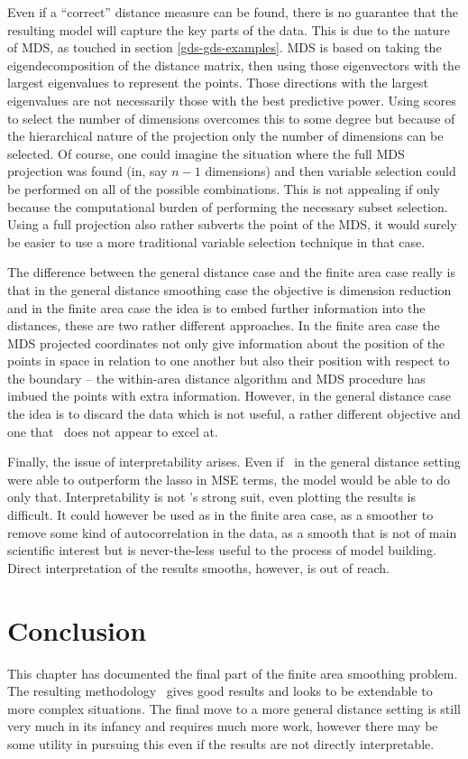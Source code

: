 Even if a ``correct'' distance measure can be found, there is no guarantee that the resulting model will capture the key parts of the data. This is due to the nature of MDS, as touched in section \ref{gds-gds-examples}. MDS is based on taking the eigendecomposition of the distance matrix, then using those eigenvectors with the largest eigenvalues to represent the points. Those directions with the largest eigenvalues are not necessarily those with the best predictive power. Using scores to select the number of dimensions overcomes this to some degree but because of the hierarchical nature of the projection only the number of dimensions can be selected. Of course, one could imagine the situation where the full MDS projection was found (in, say $n-1$ dimensions) and then variable selection could be performed on all of the possible combinations. This is not appealing if only because the computational burden of performing the necessary subset selection. Using a full projection also rather subverts the point of the MDS, it would surely be easier to use a more traditional variable selection technique in that case.

The difference between the general distance case and the finite area case really is that in the general distance smoothing case the objective is dimension reduction and in the finite area case the idea is to embed further information into the distances, these are two rather different approaches. In the finite area case the MDS projected coordinates not only give information about the position of the points in space in relation to one another but also their position with respect to the boundary -- the within-area distance algorithm and MDS procedure has imbued the points with extra information. However, in the general distance case the idea is to discard the data which is not useful, a rather different objective and one that \mdsds\ does not appear to excel at.

Finally, the issue of interpretability arises. Even if \mdsds\ in the general distance setting were able to outperform the lasso in MSE terms, the model would be able to do only that. Interpretability is not \mdsds's strong suit, even plotting the results is difficult. It could however be used as in the finite area case, as a smoother to remove some kind of autocorrelation in the data, as a smooth that is not of main scientific interest but is never-the-less useful to the process of model building. Direct interpretation of the results smooths, however, is out of reach.

\section{Conclusion}

This chapter has documented the final part of the finite area smoothing problem. The resulting methodology \mdsds\ gives good results and looks to be extendable to more complex situations. The final move to a more general distance setting is still very much in its infancy and requires much more work, however there may be some utility in pursuing this even if the results are not directly interpretable.